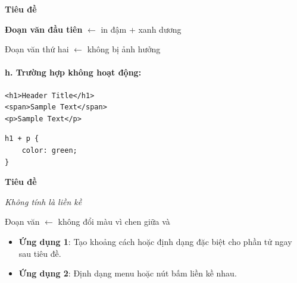 \begin{browserWindow}
\sffamily\small
{\bfseries\Large\textcolor{darkText}{Tiêu đề}} \par\vspace{4pt}
\textcolor{primaryBlue}{\textbf{Đoạn văn đầu tiên}} {\small\textcolor{gray!60}{$\leftarrow$ in đậm + xanh dương}} \par\vspace{2pt}
\textcolor{darkText}{Đoạn văn thứ hai} {\small\textcolor{gray!60}{$\leftarrow$ không bị ảnh hưởng}}
\end{browserWindow}

\paragraph{h. Trường hợp không hoạt động:}
\begin{codeWindow}
\begin{lstlisting}[language=HTML5]
<h1>Header Title</h1>
<span>Sample Text</span>
<p>Sample Text</p>
\end{lstlisting}

\begin{lstlisting}[language=CSS3]
h1 + p {
    color: green;
}
\end{lstlisting}
\end{codeWindow}

\begin{browserWindow}
\sffamily\small
{\bfseries\Large\textcolor{darkText}{Tiêu đề}} \par\vspace{4pt}
\textcolor{darkText}{\textit{Không tính là liền kề}} \par\vspace{2pt}
\textcolor{darkText}{Đoạn văn} {\small\textcolor{gray!60}{$\leftarrow$ không đổi màu vì  chen giữa  và }}
\end{browserWindow}

\begin{tipBox}
\begin{itemize}[leftmargin=1.5em, itemsep=3pt, parsep=0pt]
    \item \textbf{Ứng dụng 1}: Tạo khoảng cách hoặc định dạng đặc biệt cho phần tử ngay sau tiêu đề.
    \item \textbf{Ứng dụng 2}: Định dạng menu hoặc nút bấm liền kề nhau.
\end{itemize}
\end{tipBox}

